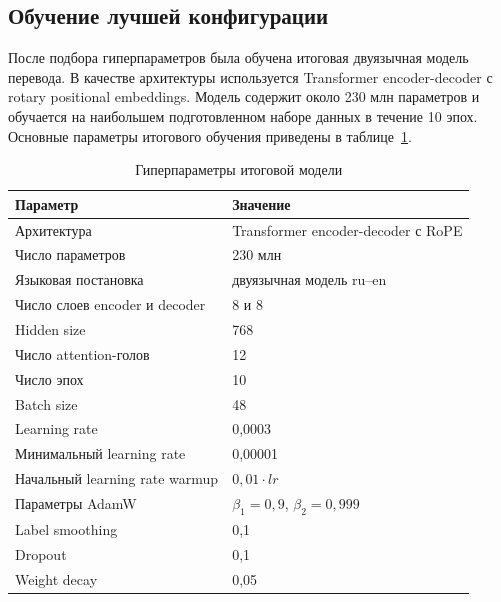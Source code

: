 \subsection{Обучение лучшей конфигурации}

После подбора гиперпараметров была обучена итоговая двуязычная модель перевода. В качестве архитектуры используется Transformer encoder-decoder с rotary positional embeddings. Модель содержит около 230 млн параметров и обучается на наибольшем подготовленном наборе данных в течение 10 эпох.
Основные параметры итогового обучения приведены в таблице~\ref{tab:final-model-hparams}.

\begin{table}[H]
	\centering
	\caption{Гиперпараметры итоговой модели}
	\label{tab:final-model-hparams}
	\begin{tabularx}{\textwidth}{|p{}|X|}
		\hline
		\textbf{Параметр}              & \textbf{Значение}                      \\
		\hline
		Архитектура                    & Transformer encoder-decoder с RoPE     \\
		\hline
		Число параметров               & 230 млн                                \\
		\hline
		Языковая постановка            & двуязычная модель ru--en               \\
		\hline
		Число слоев encoder и decoder  & 8 и 8                                  \\
		\hline
		Hidden size                    & 768                                    \\
		\hline
		Число attention-голов          & 12                                     \\
		\hline
		Число эпох                     & 10                                     \\
		\hline
		Batch size                     & 48                                     \\
		\hline
		Learning rate                  & 0{,}0003                               \\
		\hline
		Минимальный learning rate      & 0{,}00001                              \\
		\hline
		Начальный learning rate warmup & $0{,}01 \cdot lr$                      \\
		\hline
		Параметры AdamW                & $\beta_1 = 0{,}9$, $\beta_2 = 0{,}999$ \\
		\hline
		Label smoothing                & 0{,}1                                  \\
		\hline
		Dropout                        & 0{,}1                                  \\
		\hline
		Weight decay                   & 0{,}05                                 \\
		\hline
	\end{tabularx}
\end{table}


